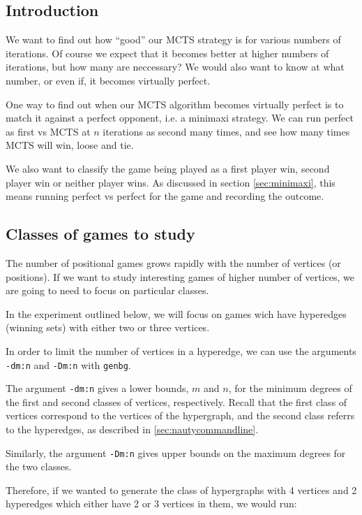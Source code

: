 \subsection{Introduction}


We want to find out how ``good'' our MCTS strategy is for various numbers of iterations.
Of course we expect that it becomes better at higher numbers of iterations, but how many are neccessary?
We would also want to know at what number, or even if, it becomes virtually perfect.


One way to find out when our MCTS algorithm becomes virtually perfect is to match it against a perfect opponent, i.e. a minimaxi strategy.
We can run perfect as first vs MCTS at $n$ iterations as second many times, and see how many times MCTS will win, loose and tie.

We also want to classify the game being played as a first player win, second player win or neither player wins.
As discussed in section \ref{sec:minimaxi}, this means running perfect vs perfect for the game and recording the outcome.


\subsection{Classes of games to study}

The number of positional games grows rapidly with the number of vertices (or positions).
If we want to study interesting games of higher number of vertices, we are going to need to focus on particular classes.

In the experiment outlined below, we will focus on games wich have hyperedges (winning sets) with either two or three vertices.

In order to limit the number of vertices in a hyperedge, we can use the arguments \texttt{-dm:n} and \texttt{-Dm:n} with \texttt{genbg}.

The argument \texttt{-dm:n} gives a lower bounds, $m$ and $n$, for the minimum degrees of the first and second classes of vertices, respectively.
Recall that the first class of vertices correspond to the vertices of the hypergraph, and the second class referrs to the hyperedges, as described in \ref{sec:nautycommandline}.

Similarly, the argument \texttt{-Dm:n} gives upper bounds on the maximum degrees for the two classes.

Therefore, if we wanted to generate the class of hypergraphs with 4 vertices and 2 hyperedges which either have 2 or 3 vertices in them, we would run:

